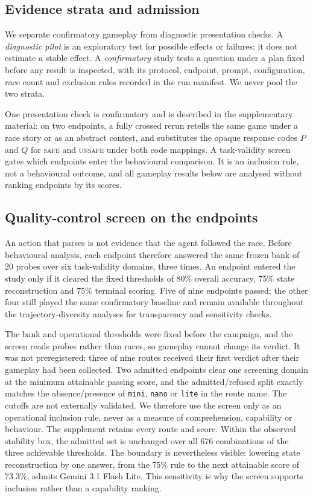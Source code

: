 \documentclass[sigconf,anonymous]{aamas}
\newcommand{\Safe}{\textsc{safe}}
\newcommand{\Unsafe}{\textsc{unsafe}}
\begin{document}
\subsection{Evidence strata and admission}

We separate confirmatory gameplay from diagnostic presentation checks. A
\emph{diagnostic pilot} is an exploratory test for possible effects or failures;
it does not estimate a stable effect. A \emph{confirmatory} study tests a
question under a plan fixed before any result is inspected, with its protocol,
endpoint, prompt, configuration, race count and exclusion rules recorded in the
run manifest. We never pool the two strata.

One presentation check is confirmatory and is described in the supplementary
material: on two endpoints, a fully crossed rerun retells the same game under a
race story or as an abstract contest, and substitutes the opaque response
codes $P$ and $Q$ for \Safe{} and \Unsafe{} under both code mappings. A
task-validity screen gates which endpoints enter the behavioural comparison. It
is an inclusion rule, not a behavioural outcome, and all gameplay results
below are analysed without ranking endpoints by its scores.

\subsection{Quality-control screen on the endpoints}
\label{sec:design-screen}

An action that parses is not evidence that the agent followed the race. Before
behavioural analysis, each endpoint therefore answered the same frozen bank of 20
probes over six task-validity domains, three times. An endpoint entered the study
only if it cleared the fixed thresholds of 80\% overall accuracy, 75\% state
reconstruction and 75\% terminal scoring. Five of nine endpoints passed; the
other four still played the same confirmatory baseline and remain available
throughout the trajectory-diversity analyses for transparency and sensitivity
checks.

The bank and operational thresholds were fixed before the campaign, and the screen reads
probes rather than races, so gameplay cannot change its verdict. It was not
preregistered: three of nine routes received their first verdict after their
gameplay had been collected. Two admitted endpoints clear one screening domain
at the minimum attainable passing score, and the admitted/refused split exactly
matches the absence/presence of \texttt{mini}, \texttt{nano} or \texttt{lite} in
the route name. The cutoffs are not externally validated. We therefore use the
screen only as an operational inclusion rule, never as a measure of comprehension,
capability or behaviour. The
supplement retains every route and score.
Within the observed stability box, the admitted set is unchanged over all 676
combinations of the three achievable thresholds. The boundary is nevertheless
visible: lowering state reconstruction by one answer, from the 75\% rule to the
next attainable score of 73.3\%, admits Gemini 3.1 Flash Lite. This sensitivity
is why the screen supports inclusion rather than a capability ranking.
\end{document}
